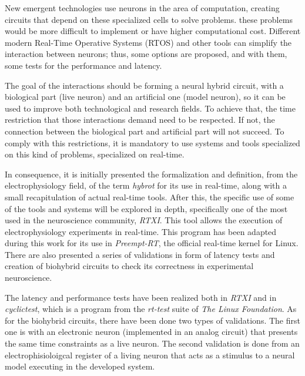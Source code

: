 

New emergent technologies use neurons in the area of computation, creating circuits that depend on these specialized cells to solve problems. these problems would be more difficult to implement or have higher computational cost. Different modern Real-Time Operative Systems (RTOS) and other tools can simplify the interaction between neurons; thus, some options are proposed, and with them, some tests for the performance and latency.

The goal of the interactions should be forming a neural hybrid circuit, with a biological part (live neuron) and an artificial one (model neuron), so it can be used to improve both technological and research fields. To achieve that, the time restriction that those interactions demand need to be respected. If not, the connection between the biological part and artificial part will not succeed. To comply with this restrictions, it is mandatory to use systems and tools specialized on this kind of problems, specialized on real-time.

In consequence, it is initially presented the formalization and definition, from the electrophysiology field, of the term \textit{hybrot} for its use in real-time, along with a small recapitulation of actual real-time tools. After this, the specific use of some of the tools and systems will be explored in depth, specifically one of the most used in the neuroscience community, \textit{RTXI}. This tool allows the execution of electrophysiology experiments in real-time. This program has been adapted during this work for its use in \textit{Preempt-RT}, the official real-time kernel for Linux. There are also presented a series of validations in form of latency tests and creation of biohybrid circuits to check its correctness in experimental neuroscience.

The latency and performance tests have been realized both in \textit{RTXI} and in \textit{cyclictest}, which is a program from the \textit{rt-test} suite of \textit{The Linux Foundation}. As for the biohybrid circuits, there have been done two types of validations. The first one is with an electronic neuron (implemented in an analog circuit) that presents the same time constraints as a live neuron. The second validation is done from an electrophisioloigcal register of a living neuron that acts as a stimulus to a neural model executing in the developed system.